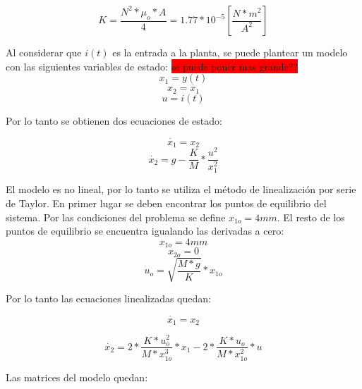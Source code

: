 \begin{equation}
	K=\frac{N^{2}*\mu_{o}*A}{4}=1.77*10^{-5} [\frac{N*m^2}{A^2}]
\end{equation}

\noindent Al considerar que $i(t)$ es la entrada a la planta, se puede plantear un modelo con las siguientes variables de estado:\newline
\colorbox{red}{se puede poner mas grande??}
\begin{equation}
	x_{1}=y(t)
\end{equation}
\begin{equation}
	x_{2}=\dot{x_{1}}
\end{equation}
\begin{equation}
	u=i(t)
\end{equation}

\noindent Por lo tanto se obtienen dos ecuaciones de estado:

\begin{equation}
	\dot{x_{1}}=x_{2}
\end{equation}
\begin{equation}
	\dot{x_{2}}=g-\frac{K}{M}*\frac{u^{2}}{x_{1}^{2}}
\end{equation}

\noindent El modelo es no lineal, por lo tanto se utiliza el método de linealización por serie de Taylor. En primer lugar se deben encontrar los puntos de equilibrio del sistema. Por las condiciones del problema se define $x_{1o}=4mm$. El resto de los puntos de equilibrio se encuentra igualando las derivadas a cero:
\begin{equation}
	x_{1o}=4mm
\end{equation}
\begin{equation}
	x_{2o}=0
\end{equation}
\begin{equation}
	u_{o}=\sqrt{\frac{M*g}{K}}*x_{1o}
\end{equation}

\noindent Por lo tanto las ecuaciones linealizadas quedan:

\begin{equation}
	\dot{x_{1}}=x_{2}
\end{equation}

\begin{equation}
	\dot{x_{2}}=2*\frac{K*u_{o}^{2}}{M*x_{1o}^{3}}*x_{1}-2*\frac{K*u_{o}}{M*x_{1o}^{2}}*u
\end{equation}

\noindent Las matrices del modelo quedan:

